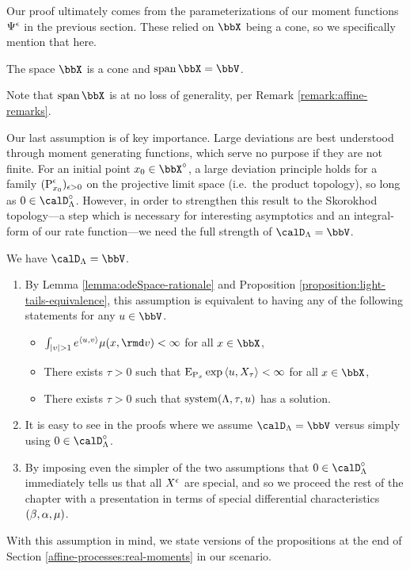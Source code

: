Our proof ultimately comes from the parameterizations of our moment functions $\Psi^\epsilon$ in the previous section.
These relied on $\stateSpace$ being a cone, so we specifically mention that here.
\begin{assumption}
  The space $\stateSpace$ is a cone and $\operatorname{span}\stateSpace = \vecSpace$.
\end{assumption}
\begin{remark}
  Note that $\operatorname{span}\stateSpace$ is at no loss of generality, per Remark \ref{remark:affine-remarks}.
\end{remark}

Our last assumption is of key importance.
Large deviations are best understood through moment generating functions, which serve no purpose if they are not finite.
For an initial point $\stateVar_0 \in \stateSpace^\circ$, a large deviation principle holds for a family $({\operatorname{P}}^\epsilon_{x_0})_{\epsilon>0}$ on the projective limit space (i.e.\ the product topology), so long as $0 \in \odeSpace^\circ$.
However, in order to strengthen this result to the Skorokhod topology---a step which is necessary for interesting asymptotics and an integral-form of our rate function---we need the full strength of $\odeSpace = \vecSpace$.
\begin{assumption}
  We have $\odeSpace = \vecSpace$.
\end{assumption}
\begin{remark}
  \begin{enumerate}[label=(\alph*)]
    \item
      By Lemma \ref{lemma:odeSpace-rationale} and Proposition \ref{proposition:light-tails-equivalence}, this assumption is equivalent to having any of the following statements for any $\momentVar \in \vecSpace$.
      \begin{itemize}
        \item
          $\int_{|\markVar| > 1} e^\prj{\momentVar}{\markVar} \affJump(\stateVar, \rmd\markVar) < \infty$ for all $\stateVar \in \stateSpace$,
        \item
          There exists $\tau > 0$ such that ${\operatorname{E}}_{{\operatorname{P}}_x}\exp{\langle u, X_\tau \rangle} < \infty$ for all $\stateVar \in \stateSpace$,
        \item
          There exists $\tau > 0$ such that $\operatorname{system}(\Lambda, \tau, u)$ has a solution.
      \end{itemize}
    \item
      It is easy to see in the proofs where we assume $\odeSpace = \vecSpace$ versus simply using $0 \in \odeSpace^\circ$.
    \item
      By imposing even the simpler of the two assumptions that $0 \in \odeSpace^\circ$ immediately tells us that all $X^\epsilon$ are special, and so we proceed the rest of the chapter with a presentation in terms of special differential characteristics $(\beta, \alpha, \mu)$.
  \end{enumerate}
\end{remark}

With this assumption in mind, we state versions of the propositions at the end of Section \ref{affine-processes:real-moments} in our scenario.


